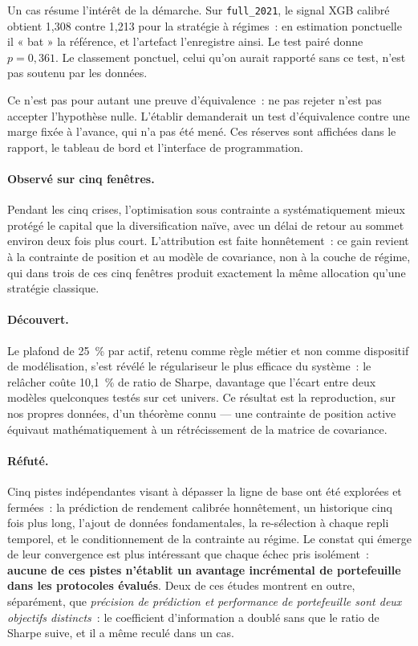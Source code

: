 Un cas résume l'intérêt de la démarche. Sur \texttt{full\_2021}, le signal XGB
calibré obtient 1,308 contre 1,213 pour la stratégie à régimes~: en estimation
ponctuelle il « bat » la référence, et l'artefact l'enregistre ainsi. Le test
pairé donne $p = 0{,}361$. Le classement ponctuel, celui qu'on aurait rapporté
sans ce test, n'est pas soutenu par les données.

Ce n'est pas pour autant une preuve d'équivalence~: ne pas rejeter n'est pas
accepter l'hypothèse nulle. L'établir demanderait un test d'équivalence contre une
marge fixée à l'avance, qui n'a pas été mené. Ces réserves sont affichées dans le
rapport, le tableau de bord et l'interface de programmation.

\paragraph{Observé sur cinq fenêtres.} Pendant les cinq crises, l'optimisation sous
contrainte a systématiquement mieux protégé le capital que la diversification
naïve, avec un délai de retour au sommet environ deux fois plus court.
L'attribution est faite honnêtement~: ce gain revient à la contrainte de position
et au modèle de covariance, non à la couche de régime, qui dans trois de ces cinq
fenêtres produit exactement la même allocation qu'une stratégie classique.

\paragraph{Découvert.} Le plafond de 25~\% par actif, retenu comme règle métier et
non comme dispositif de modélisation, s'est révélé le régulariseur le plus
efficace du système~: le relâcher coûte 10,1~\% de ratio de Sharpe, davantage que
l'écart entre deux modèles quelconques testés sur cet univers. Ce résultat est la
reproduction, sur nos propres données, d'un théorème connu — une contrainte de
position active équivaut mathématiquement à un rétrécissement de la matrice de
covariance.

\paragraph{Réfuté.} Cinq pistes indépendantes visant à dépasser la ligne de base
ont été explorées et fermées~: la prédiction de rendement calibrée honnêtement,
un historique cinq fois plus long, l'ajout de données fondamentales, la
re-sélection à chaque repli temporel, et le conditionnement de la contrainte au
régime. Le constat qui émerge de leur convergence est plus intéressant que chaque
échec pris isolément~: \textbf{aucune de ces pistes n'établit un avantage
incrémental de portefeuille dans les protocoles évalués}. Deux de ces études
montrent en outre, séparément, que \emph{précision de prédiction et
performance de portefeuille sont deux objectifs distincts}~: le coefficient
d'information a doublé sans que le ratio de Sharpe suive, et il a même reculé
dans un cas.

